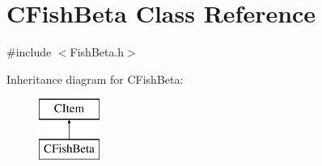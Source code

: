 \hypertarget{class_c_fish_beta}{}\section{C\+Fish\+Beta Class Reference}
\label{class_c_fish_beta}


{\ttfamily \#include $<$Fish\+Beta.\+h$>$}

Inheritance diagram for C\+Fish\+Beta\+:\begin{figure}[H]
\begin{center}
\leavevmode
\includegraphics[height=2.000000cm]{class_c_fish_beta}
\end{center}
\end{figure}
